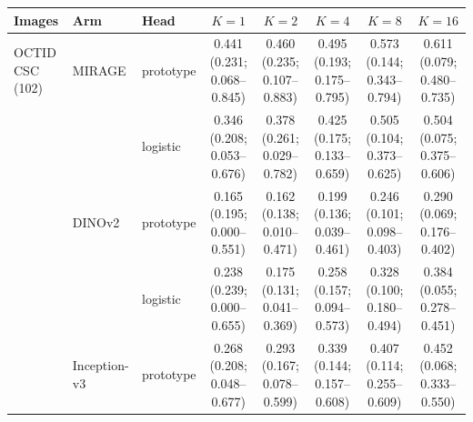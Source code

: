 \begin{tabular}{@{}lll*{5}{c}@{}}
\toprule
Images & Arm & Head & $K=1$ & $K=2$ & $K=4$ & $K=8$ & $K=16$ \\
\midrule
OCTID CSC (102) & MIRAGE & prototype & \makecell{0.441\\{\scriptsize (0.231; 0.068--0.845)}} & \makecell{0.460\\{\scriptsize (0.235; 0.107--0.883)}} & \makecell{0.495\\{\scriptsize (0.193; 0.175--0.795)}} & \makecell{0.573\\{\scriptsize (0.144; 0.343--0.794)}} & \makecell{0.611\\{\scriptsize (0.079; 0.480--0.735)}} \\
 &  & logistic & \makecell{0.346\\{\scriptsize (0.208; 0.053--0.676)}} & \makecell{0.378\\{\scriptsize (0.261; 0.029--0.782)}} & \makecell{0.425\\{\scriptsize (0.175; 0.133--0.659)}} & \makecell{0.505\\{\scriptsize (0.104; 0.373--0.625)}} & \makecell{0.504\\{\scriptsize (0.075; 0.375--0.606)}} \\
 & DINOv2 & prototype & \makecell{0.165\\{\scriptsize (0.195; 0.000--0.551)}} & \makecell{0.162\\{\scriptsize (0.138; 0.010--0.471)}} & \makecell{0.199\\{\scriptsize (0.136; 0.039--0.461)}} & \makecell{0.246\\{\scriptsize (0.101; 0.098--0.403)}} & \makecell{0.290\\{\scriptsize (0.069; 0.176--0.402)}} \\
 &  & logistic & \makecell{0.238\\{\scriptsize (0.239; 0.000--0.655)}} & \makecell{0.175\\{\scriptsize (0.131; 0.041--0.369)}} & \makecell{0.258\\{\scriptsize (0.157; 0.094--0.573)}} & \makecell{0.328\\{\scriptsize (0.100; 0.180--0.494)}} & \makecell{0.384\\{\scriptsize (0.055; 0.278--0.451)}} \\
 & Inception-v3 & prototype & \makecell{0.268\\{\scriptsize (0.208; 0.048--0.677)}} & \makecell{0.293\\{\scriptsize (0.167; 0.078--0.599)}} & \makecell{0.339\\{\scriptsize (0.144; 0.157--0.608)}} & \makecell{0.407\\{\scriptsize (0.114; 0.255--0.609)}} & \makecell{0.452\\{\scriptsize (0.068; 0.333--0.550)}} \\

\end{tabular}
